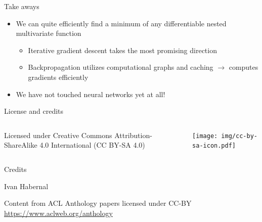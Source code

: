 \documentclass[12pt,aspectratio=169,handout]{beamer}
\begin{document}
\begin{frame}{Take aways}
	
	\begin{itemize}
		
		\item We can quite efficiently find a minimum of any differentiable nested multivariate function
		\begin{itemize}
			\item Iterative gradient descent takes the most promising direction
			\item Backpropagation utilizes computational graphs and caching $\to$ computes gradients efficiently
		\end{itemize}
		\item We have not touched neural networks yet at all!
	\end{itemize}
	
\end{frame}



\begin{frame}{License and credits}
	
	\begin{columns}
		\begin{column}{0.7\textwidth}
			Licensed under Creative Commons Attribution-ShareAlike 4.0 International (CC BY-SA 4.0)
		\end{column}
		\begin{column}{0.2\textwidth}
			\texttt{[image: img/cc-by-sa-icon.pdf]}
		\end{column}
	\end{columns}
	
	\bigskip
	
	Credits
	
	\begin{scriptsize}
		
		Ivan Habernal
		
		Content from ACL Anthology papers licensed under CC-BY \url{https://www.aclweb.org/anthology}
		
	\end{scriptsize}
	
\end{frame}
\end{document}

